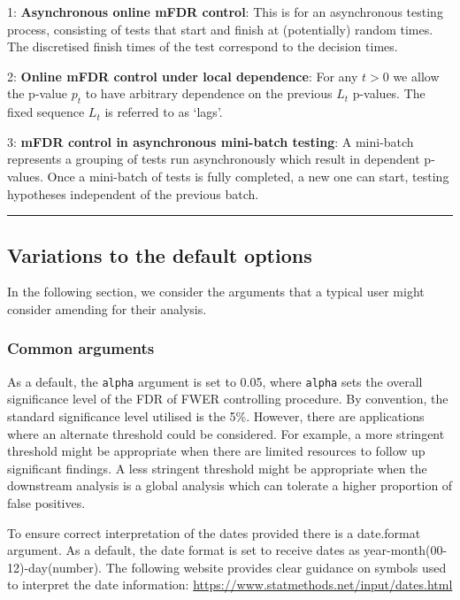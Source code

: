 \documentclass[
]{article}
\begin{document}
1: \textbf{Asynchronous online mFDR control}: This is for an
asynchronous testing process, consisting of tests that start and finish
at (potentially) random times. The discretised finish times of the test
correspond to the decision times.

2: \textbf{Online mFDR control under local dependence}: For any \(t>0\)
we allow the p-value \(p_t\) to have arbitrary dependence on the
previous \(L_t\) p-values. The fixed sequence \(L_t\) is referred to as
`lags'.

3: \textbf{mFDR control in asynchronous mini-batch testing}: A
mini-batch represents a grouping of tests run asynchronously which
result in dependent p-values. Once a mini-batch of tests is fully
completed, a new one can start, testing hypotheses independent of the
previous batch.

\begin{center}\rule{0.5\linewidth}{0.5pt}\end{center}

\hypertarget{variations-to-the-default-options}{%
\subsection{Variations to the default
options}\label{variations-to-the-default-options}}

In the following section, we consider the arguments that a typical user
might consider amending for their analysis.

\hypertarget{common-arguments}{%
\subsubsection{Common arguments}\label{common-arguments}}

As a default, the \texttt{alpha} argument is set to 0.05, where
\texttt{alpha} sets the overall significance level of the FDR of FWER
controlling procedure. By convention, the standard significance level
utilised is the 5\%. However, there are applications where an alternate
threshold could be considered. For example, a more stringent threshold
might be appropriate when there are limited resources to follow up
significant findings. A less stringent threshold might be appropriate
when the downstream analysis is a global analysis which can tolerate a
higher proportion of false positives.

To ensure correct interpretation of the dates provided there is a
date.format argument. As a default, the date format is set to receive
dates as year-month(00-12)-day(number). The following website provides
clear guidance on symbols used to interpret the date information:
\url{https://www.statmethods.net/input/dates.html}
\end{document}
